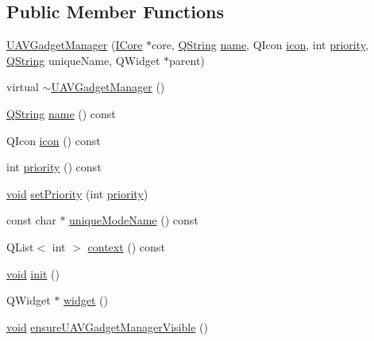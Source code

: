 \subsection*{\-Public \-Member \-Functions}
\begin{DoxyCompactItemize}
\item 
\hyperlink{group___core_plugin_gaafe1ad3bbbc0f406d14529f20d61b981}{\-U\-A\-V\-Gadget\-Manager} (\hyperlink{class_core_1_1_i_core}{\-I\-Core} $\ast$core, \hyperlink{group___u_a_v_objects_plugin_gab9d252f49c333c94a72f97ce3105a32d}{\-Q\-String} \hyperlink{group___core_plugin_ga1e4c1ea0c0876c989d6c62545d239837}{name}, \-Q\-Icon \hyperlink{group___core_plugin_gaa78801714eacd4be88c94f7ae90aae7a}{icon}, int \hyperlink{group___core_plugin_ga912a165a46888c9dafb5ba50b05e62e2}{priority}, \hyperlink{group___u_a_v_objects_plugin_gab9d252f49c333c94a72f97ce3105a32d}{\-Q\-String} unique\-Name, \-Q\-Widget $\ast$parent)
\item 
virtual \hyperlink{group___core_plugin_ga1b25440353864a36dd0f1d9a62e434ac}{$\sim$\-U\-A\-V\-Gadget\-Manager} ()
\item 
\hyperlink{group___u_a_v_objects_plugin_gab9d252f49c333c94a72f97ce3105a32d}{\-Q\-String} \hyperlink{group___core_plugin_ga1e4c1ea0c0876c989d6c62545d239837}{name} () const 
\item 
\-Q\-Icon \hyperlink{group___core_plugin_gaa78801714eacd4be88c94f7ae90aae7a}{icon} () const 
\item 
int \hyperlink{group___core_plugin_ga912a165a46888c9dafb5ba50b05e62e2}{priority} () const 
\item 
\hyperlink{group___u_a_v_objects_plugin_ga444cf2ff3f0ecbe028adce838d373f5c}{void} \hyperlink{group___core_plugin_gac0180544ce53efc69e7e9f4d45269463}{set\-Priority} (int \hyperlink{group___core_plugin_ga912a165a46888c9dafb5ba50b05e62e2}{priority})
\item 
const char $\ast$ \hyperlink{group___core_plugin_gafb097fcb2b5b3aca65315305bc09872d}{unique\-Mode\-Name} () const 
\item 
\-Q\-List$<$ int $>$ \hyperlink{group___core_plugin_gaeef334ae2d88e0490cea760db1c90684}{context} () const 
\item 
\hyperlink{group___u_a_v_objects_plugin_ga444cf2ff3f0ecbe028adce838d373f5c}{void} \hyperlink{group___core_plugin_ga478da8486a7df4755e4623c70251e17c}{init} ()
\item 
\-Q\-Widget $\ast$ \hyperlink{group___core_plugin_ga25fccbeabcca631b76af421f136114db}{widget} ()
\item 
\hyperlink{group___u_a_v_objects_plugin_ga444cf2ff3f0ecbe028adce838d373f5c}{void} \hyperlink{group___core_plugin_ga8c12c4c05d96b0f0b5015971c8501ed7}{ensure\-U\-A\-V\-Gadget\-Manager\-Visible} ()

\end{DoxyCompactItemize}
